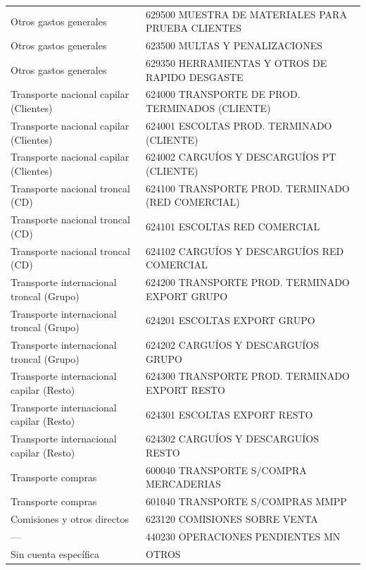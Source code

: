 \documentclass[11pt,letterpaper]{article}
\begin{document}
\begin{xltabular}{\textwidth}{L{5.2cm} Y}
Otros gastos generales & 629500 MUESTRA DE MATERIALES PARA PRUEBA CLIENTES \\
 Otros gastos generales & 623500 MULTAS Y PENALIZACIONES \\
Otros gastos generales & 629350 HERRAMIENTAS Y OTROS DE RAPIDO DESGASTE \\
 Transporte nacional capilar (Clientes) & 624000 TRANSPORTE DE PROD. TERMINADOS (CLIENTE) \\
Transporte nacional capilar (Clientes) & 624001 ESCOLTAS PROD. TERMINADO (CLIENTE) \\
 Transporte nacional capilar (Clientes) & 624002 CARGUÍOS Y DESCARGUÍOS PT (CLIENTE) \\
Transporte nacional troncal (CD) & 624100 TRANSPORTE PROD. TERMINADO (RED COMERCIAL) \\
 Transporte nacional troncal (CD) & 624101 ESCOLTAS RED COMERCIAL \\
Transporte nacional troncal (CD) & 624102 CARGUÍOS Y DESCARGUÍOS RED COMERCIAL \\
 Transporte internacional troncal (Grupo) & 624200 TRANSPORTE PROD. TERMINADO EXPORT GRUPO \\
Transporte internacional troncal (Grupo) & 624201 ESCOLTAS EXPORT GRUPO \\
 Transporte internacional troncal (Grupo) & 624202 CARGUÍOS Y DESCARGUÍOS GRUPO \\
Transporte internacional capilar (Resto) & 624300 TRANSPORTE PROD. TERMINADO EXPORT RESTO \\
 Transporte internacional capilar (Resto) & 624301 ESCOLTAS EXPORT RESTO \\
Transporte internacional capilar (Resto) & 624302 CARGUÍOS Y DESCARGUÍOS RESTO \\
 Transporte compras & 600040 TRANSPORTE S/COMPRA MERCADERIAS \\
Transporte compras & 601040 TRANSPORTE S/COMPRAS MMPP \\
 Comisiones y otros directos & 623120 COMISIONES SOBRE VENTA \\
--- & 440230 OPERACIONES PENDIENTES MN \\
 Sin cuenta específica & OTROS \\
\end{xltabular}
\end{document}

